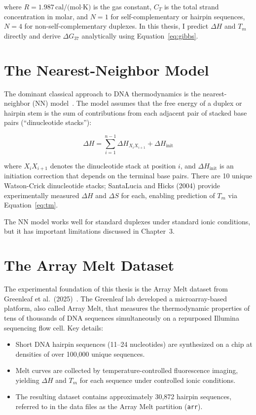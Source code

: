 \documentclass[12pt,oneside,letterpaper]{report}
\begin{document}
where $R = 1.987\,\text{cal/(mol·K)}$ is the gas constant, $C_T$ is the total strand concentration in molar, and $N = 1$ for self-complementary or hairpin sequences, $N = 4$ for non-self-complementary duplexes. In this thesis, I predict $\Delta H$ and $T_m$ directly and derive $\Delta G_{37}$ analytically using Equation~\ref{eq:gibbs}.

\section{The Nearest-Neighbor Model}

The dominant classical approach to DNA thermodynamics is the nearest-neighbor (NN) model~\cite{santalucia1998,santalucia2004}. The model assumes that the free energy of a duplex or hairpin stem is the sum of contributions from each adjacent pair of stacked base pairs (``dinucleotide stacks''):

\begin{equation}
    \Delta H = \sum_{i=1}^{n-1} \Delta H_{X_i X_{i+1}} + \Delta H_{\text{init}}
    \label{eq:nn}
\end{equation}

where $X_i X_{i+1}$ denotes the dinucleotide stack at position $i$, and $\Delta H_{\text{init}}$ is an initiation correction that depends on the terminal base pairs. There are 10 unique Watson-Crick dinucleotide stacks; SantaLucia and Hicks (2004) provide experimentally measured $\Delta H$ and $\Delta S$ for each, enabling prediction of $T_m$ via Equation~\ref{eq:tm}.

The NN model works well for standard duplexes under standard ionic conditions, but it has important limitations discussed in Chapter~3.

\section{The Array Melt Dataset}

The experimental foundation of this thesis is the Array Melt dataset from Greenleaf et al.\ (2025)~\cite{greenleaf2025}. The Greenleaf lab developed a microarray-based platform, also called Array Melt, that measures the thermodynamic properties of tens of thousands of DNA sequences simultaneously on a repurposed Illumina sequencing flow cell. Key details:

\begin{itemize}
    \item Short DNA hairpin sequences (11--24 nucleotides) are synthesized on a chip at densities of over 100,000 unique sequences.
    \item Melt curves are collected by temperature-controlled fluorescence imaging, yielding $\Delta H$ and $T_m$ for each sequence under controlled ionic conditions.
    \item The resulting dataset contains approximately 30,872 hairpin sequences, referred to in the data files as the Array Melt partition (\texttt{arr}).
\end{itemize}
\end{document}
